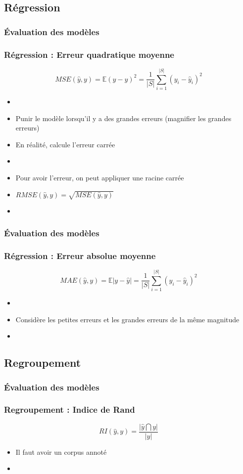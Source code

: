 \documentclass[xcolor=table]{beamer}
\begin{document}
\subsection{Régression}

\begin{frame}
	\frametitle{Évaluation des modèles}
	\frametitle{Régression : Erreur quadratique moyenne}
	
	\[MSE(\hat{y}, y) = \mathbb{E}(y - \hat{y})^2 =  \frac{1}{|S|} \sum_{i=1}^{|S|} (y_i - \hat{y}_i)^2\]
	
	\begin{itemize}
		\item {}
		\item Punir le modèle lorsqu'il y a des grandes erreurs (magnifier les grandes erreurs)
		\item En réalité, calcule l'erreur carrée
		\item {}
		\item Pour avoir l'erreur, on peut appliquer une racine carrée
		\item $RMSE(\hat{y}, y) = \sqrt{MSE(\hat{y}, y)}$
		\item {}
	\end{itemize}
	
\end{frame}

\begin{frame}
	\frametitle{Évaluation des modèles}
	\frametitle{Régression : Erreur absolue moyenne}
	
	\[MAE(\hat{y}, y) = \mathbb{E}|y - \hat{y}| =  \frac{1}{|S|} \sum_{i=1}^{|S|} (y_i - \hat{y}_i)^2\]
	
	\begin{itemize}
		\item {}
		\item Considère les petites erreurs et les grandes erreurs de la même magnitude
		\item {}
	\end{itemize}
	
\end{frame}

\subsection{Regroupement}

\begin{frame}
	\frametitle{Évaluation des modèles}
	\frametitle{Regroupement : Indice de Rand}
	
	\[RI(\hat{y}, y) = \frac{|\hat{y} \bigcap y|}{|y|}\]
	
	\begin{itemize}
		\item Il faut avoir un corpus annoté
		\item {}
	\end{itemize}
	
\end{frame}
\end{document}
